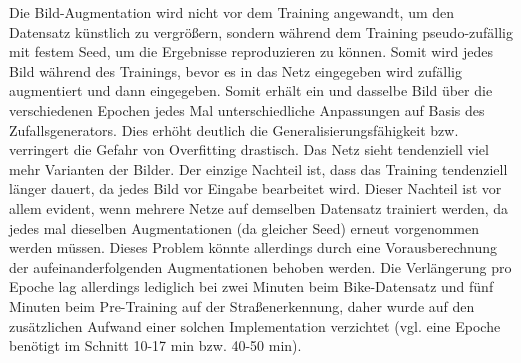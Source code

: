 Die Bild-Augmentation wird nicht vor dem Training angewandt, um den Datensatz künstlich zu vergrößern, 
sondern während dem Training pseudo-zufällig mit festem Seed, um die Ergebnisse reproduzieren zu können.
Somit wird jedes Bild während des Trainings, bevor es in das Netz eingegeben wird zufällig augmentiert 
und dann eingegeben. Somit erhält ein und dasselbe Bild über die verschiedenen Epochen jedes Mal unterschiedliche 
Anpassungen auf Basis des Zufallsgenerators. Dies erhöht deutlich die Generalisierungsfähigkeit bzw. 
verringert die Gefahr von Overfitting drastisch. Das Netz sieht tendenziell viel mehr Varianten der Bilder. 
Der einzige Nachteil ist, dass das Training tendenziell länger dauert, da jedes Bild vor Eingabe bearbeitet wird. 
Dieser Nachteil ist vor allem evident, wenn mehrere Netze auf demselben Datensatz trainiert werden, da jedes mal 
dieselben Augmentationen (da gleicher Seed) erneut vorgenommen werden müssen. Dieses Problem könnte allerdings
durch eine Vorausberechnung der aufeinanderfolgenden Augmentationen behoben werden. 
Die Verlängerung pro Epoche lag allerdings lediglich bei zwei Minuten beim Bike-Datensatz und fünf Minuten beim Pre-Training auf der 
Straßenerkennung, daher wurde auf den zusätzlichen Aufwand einer solchen Implementation verzichtet 
(vgl. eine Epoche benötigt im Schnitt 10-17 min bzw. 40-50 min). 

